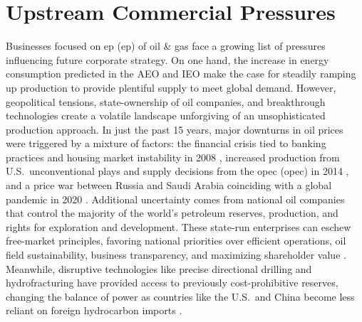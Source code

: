\section{Upstream Commercial Pressures}\label{ch1:upstream}
Businesses focused on \acrlong{ep} (\acrshort{ep}) of oil \& gas face a growing list of pressures influencing future corporate strategy. On one hand, the increase in energy consumption predicted in the AEO and IEO make the case for steadily ramping up production to provide plentiful supply to meet global demand. However, geopolitical tensions, state-ownership of oil companies, and breakthrough technologies create a volatile landscape unforgiving of an unsophisticated production approach. In just the past 15 years, major downturns in oil prices were triggered by a mixture of factors: the financial crisis tied to banking practices and housing market instability in 2008 \citep{singh_2007-2008_2021}, increased production from U.S.\ unconventional plays and supply decisions from the \acrlong{opec} (\acrshort{opec}) in 2014 \citep{lioudis_what_2021}, and a price war between Russia and Saudi Arabia coinciding with a global pandemic in 2020 \citep{blessing_what_2021}. Additional uncertainty comes from national oil companies that control the majority of the world’s petroleum reserves, production, and rights for exploration and development. These state-run enterprises can eschew free-market principles, favoring national priorities over efficient operations, oil field sustainability, business transparency, and maximizing shareholder value \citep{pirog_role_2007}. Meanwhile, disruptive technologies like precise directional drilling and hydrofracturing have provided access to previously cost-prohibitive reserves, changing the balance of power as countries like the U.S.\ and China become less reliant on foreign hydrocarbon imports \citep{shuen_dynamic_2014}.


